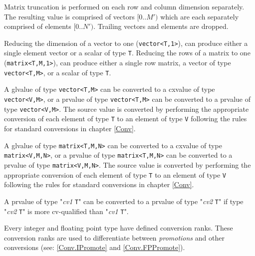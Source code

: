 \p Matrix truncation is performed on each row and column dimension separately.
The resulting value is comprised of vectors \( [0..M\prime) \) which are each
separately comprised of elements \( [0..N\prime) \). Trailing vectors and elements are
dropped.

\p Reducing the dimension of a vector to one (\texttt{vector<T,1>}), can produce
either a single element vector or a scalar of type \texttt{T}. Reducing the rows
of a matrix to one (\texttt{matrix<T,M,1>}), can produce either a single row
matrix, a vector of type \texttt{vector<T,M>}, or a scalar of type \texttt{T}.


\p A glvalue of type \texttt{vector<T,M>} can be converted to a cxvalue of type
\texttt{vector<V,M>}, or a prvalue of type \texttt{vector<T,M>} can be converted
to a prvalue of type \texttt{vector<V,M>}. The source value is converted by
performing the appropriate conversion of each element of type \texttt{T} to an
element of type \texttt{V} following the rules for standard conversions in
chapter \ref{Conv}.

\p A glvalue of type \texttt{matrix<T,M,N>} can be converted to a cxvalue of
type \texttt{matrix<V,M,N>}, or a prvalue of type \texttt{matrix<T,M,N>} can be
converted to a prvalue of type \texttt{matrix<V,M,N>}. The source value is
converted by performing the appropriate conversion of each element of type
\texttt{T} to an element of type \texttt{V} following the rules for standard
conversions in chapter \ref{Conv}.


A prvalue of type "\textit{cv1} \texttt{T}" can be converted to a prvalue of
type "\textit{cv2} \texttt{T}" if type "\textit{cv2} \texttt{T}" is more
cv-qualified than "\textit{cv1} \texttt{T}".


\p Every integer and floating point type have defined conversion ranks. These
conversion ranks are used to differentiate between \textit{promotions} and other
conversions (see: \ref{Conv.IPromote} and \ref{Conv.FPPromote}).


